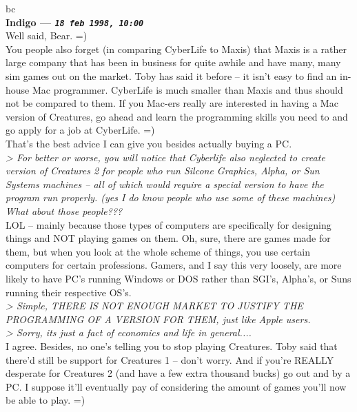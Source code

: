 \documentclass[11pt,twoside,a4paper]{article}
\begin{document}
\begin{multicols*}{2}
bc~\\

 
		
	
		
\textbf{Indigo --- \emph{\texttt{18 feb 1998, 10:00}}}~\\

Well said, Bear. =)~\\

You people also forget (in comparing CyberLife to Maxis) that Maxis is a rather large company that has been in business for quite awhile and have many, many sim games out on the market. Toby has said it before -- it isn't easy to find an in-house Mac programmer. CyberLife is much smaller than Maxis and thus should not be compared to them. If you Mac-ers really are interested in having a Mac version of Creatures, go ahead and learn the programming skills you need to and go apply for a job at CyberLife. =)~\\
That's the best advice I can give you besides actually buying a PC.~\\

\emph{> For better or worse, you will notice that Cyberlife also neglected to create version of Creatures 2 for people who run Silcone Graphics, Alpha, or Sun Systems machines -- all of which would require a special version to have the program run properly.  (yes I do know people who use some of these machines)  What about those people???}~\\

LOL -- mainly because those types of computers are specifically for designing things and NOT playing games on them. Oh, sure, there are games made for them, but when you look at the whole scheme of things, you use certain computers for certain professions. Gamers, and I say this very loosely, are more likely to have PC's running Windows or DOS rather than SGI's, Alpha's, or Suns running their respective OS's.~\\

\emph{> Simple, THERE IS NOT ENOUGH MARKET TO JUSTIFY THE PROGRAMMING OF A VERSION FOR THEM, just like Apple users.}~\\
\emph{> Sorry, its just a fact of economics and life in general....}~\\

I agree. Besides, no one's telling you to stop playing Creatures. Toby said that there'd still be support for Creatures 1 -- don't worry. And if you're REALLY desperate for Creatures 2 (and have a few extra thousand bucks) go out and by a PC. I suppose it'll eventually pay of considering the amount of games you'll now be able to play. =)~\\


\end{multicols*}
\end{document}

